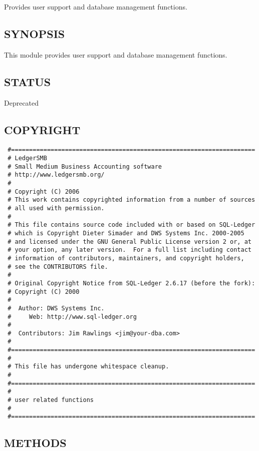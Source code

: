\begin{description}
\begin{description}
\begin{description}
\begin{description}
\begin{description}
\begin{description}
Provides user support and database management functions.

\subsection*{SYNOPSIS\label{LedgerSMB::User_SYNOPSIS}}


This module provides user support and database management functions.

\subsection*{STATUS\label{LedgerSMB::User_STATUS}}


Deprecated

\subsection*{COPYRIGHT\label{LedgerSMB::User_COPYRIGHT}}
\begin{verbatim}
 #====================================================================
 # LedgerSMB
 # Small Medium Business Accounting software
 # http://www.ledgersmb.org/
 #
 # Copyright (C) 2006
 # This work contains copyrighted information from a number of sources
 # all used with permission.
 #
 # This file contains source code included with or based on SQL-Ledger
 # which is Copyright Dieter Simader and DWS Systems Inc. 2000-2005
 # and licensed under the GNU General Public License version 2 or, at
 # your option, any later version.  For a full list including contact
 # information of contributors, maintainers, and copyright holders,
 # see the CONTRIBUTORS file.
 #
 # Original Copyright Notice from SQL-Ledger 2.6.17 (before the fork):
 # Copyright (C) 2000
 #
 #  Author: DWS Systems Inc.
 #     Web: http://www.sql-ledger.org
 #
 #  Contributors: Jim Rawlings <jim@your-dba.com>
 #
 #====================================================================
 #
 # This file has undergone whitespace cleanup.
 #
 #====================================================================
 #
 # user related functions
 #
 #====================================================================
\end{verbatim}
\subsection*{METHODS\label{LedgerSMB::User_METHODS}}
\begin{description}


\end{description}
\end{description}
\end{description}
\end{description}
\end{description}
\end{description}
\end{description}
